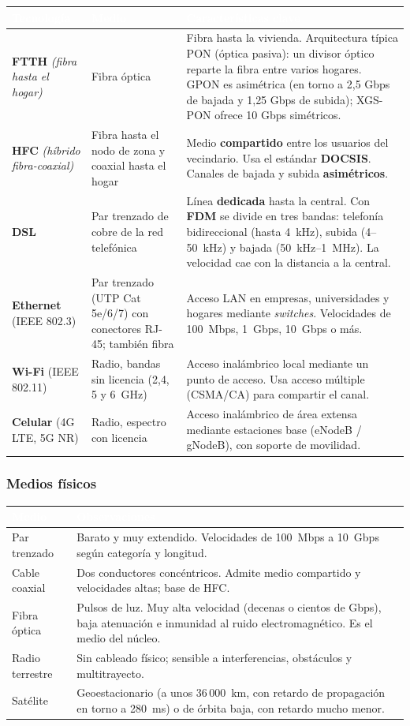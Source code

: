 \documentclass[11pt,a4paper]{article}
\newcommand{\hd}[1]{\cellcolor{uahblue}\textcolor{white}{\textbf{#1}}}
\newcommand{\en}[1]{\emph{(#1)}}
\begin{document}
\begin{tabularx}{\textwidth}{@{}L{2.6cm}L{3.3cm}X@{}}
\toprule
\hd{Tecnología} & \hd{Medio} & \hd{Características clave} \\
\midrule
\textbf{FTTH} \en{fibra hasta el hogar} & Fibra óptica & Fibra hasta la vivienda. Arquitectura típica PON (óptica pasiva): un divisor óptico reparte la fibra entre varios hogares. GPON es asimétrica (en torno a 2{,}5 Gbps de bajada y 1{,}25 Gbps de subida); XGS-PON ofrece 10 Gbps simétricos. \\
\textbf{HFC} \en{híbrido fibra-coaxial} & Fibra hasta el nodo de zona y coaxial hasta el hogar & Medio \textbf{compartido} entre los usuarios del vecindario. Usa el estándar \textbf{DOCSIS}. Canales de bajada y subida \textbf{asimétricos}. \\
\textbf{DSL} & Par trenzado de cobre de la red telefónica & Línea \textbf{dedicada} hasta la central. Con \textbf{FDM} se divide en tres bandas: telefonía bidireccional (hasta 4~kHz), subida (4--50~kHz) y bajada (50~kHz--1~MHz). La velocidad cae con la distancia a la central. \\
\textbf{Ethernet} (IEEE 802.3) & Par trenzado (UTP Cat\,5e/6/7) con conectores RJ-45; también fibra & Acceso LAN en empresas, universidades y hogares mediante \emph{switches}. Velocidades de 100~Mbps, 1~Gbps, 10~Gbps o más. \\
\textbf{Wi-Fi} (IEEE 802.11) & Radio, bandas sin licencia (2{,}4, 5 y 6~GHz) & Acceso inalámbrico local mediante un punto de acceso. Usa acceso múltiple (CSMA/CA) para compartir el canal. \\
\textbf{Celular} (4G LTE, 5G NR) & Radio, espectro con licencia & Acceso inalámbrico de área extensa mediante estaciones base (eNodeB / gNodeB), con soporte de movilidad. \\
\bottomrule
\end{tabularx}

\subsubsection{Medios físicos}

\begin{tabularx}{\textwidth}{@{}L{3.2cm}X@{}}
\toprule
\hd{Medio} & \hd{Observaciones} \\
\midrule
Par trenzado & Barato y muy extendido. Velocidades de 100~Mbps a 10~Gbps según categoría y longitud. \\
Cable coaxial & Dos conductores concéntricos. Admite medio compartido y velocidades altas; base de HFC. \\
Fibra óptica & Pulsos de luz. Muy alta velocidad (decenas o cientos de Gbps), baja atenuación e inmunidad al ruido electromagnético. Es el medio del núcleo. \\
Radio terrestre & Sin cableado físico; sensible a interferencias, obstáculos y multitrayecto. \\
Satélite & Geoestacionario (a unos 36\,000~km, con retardo de propagación en torno a 280~ms) o de órbita baja, con retardo mucho menor. \\
\bottomrule
\end{tabularx}
\end{document}
